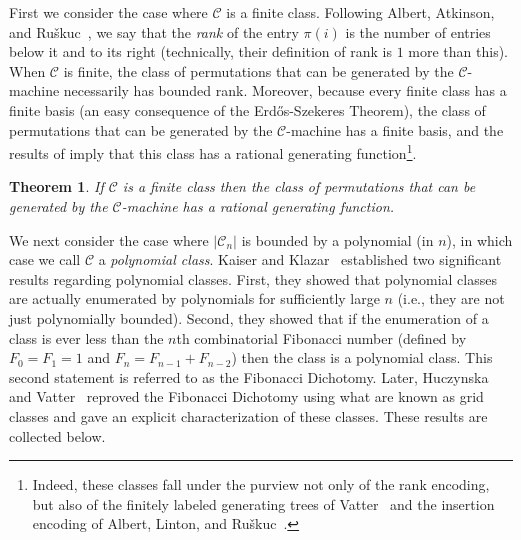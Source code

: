 \documentclass[10pt]{article}
\theoremstyle{plain}
\newtheorem{theorem}{Theorem}[section]
\theoremstyle{definition}
\newcommand{\C}{\mathcal{C}}
\begin{document}
First we consider the case where $\C$ is a finite class. Following Albert, Atkinson, and Ru\v{s}kuc~\cite{albert:regular-closed-:}, we say that the \emph{rank} of the entry $\pi(i)$ is the number of entries below it and to its right (technically, their definition of rank is $1$ more than this). When $\C$ is finite, the class of permutations that can be generated by the $\C$-machine necessarily has bounded rank. Moreover, because every finite class has a finite basis (an easy consequence of the Erd\H{o}s-Szekeres Theorem), the class of permutations that can be generated by the $\C$-machine has a finite basis, and the results of \cite{albert:regular-closed-:} imply that this class has a rational generating function\footnote{Indeed, these classes fall under the purview not only of the rank encoding, but also of the finitely labeled generating trees of Vatter~\cite{vatter:finitely-labele:} and the insertion encoding of Albert, Linton, and Ru\v{s}kuc~\cite{albert:the-insertion-e:}.}.

\begin{theorem}
\label{thm-finite-machine}
If $\C$ is a finite class then the class of permutations that can be generated by the $\C$-machine has a rational generating function.	
\end{theorem}


We next consider the case where $|\C_n|$ is bounded by a polynomial (in $n$), in which case we call $\C$ a \emph{polynomial class}. Kaiser and Klazar~\cite{kaiser:on-growth-rates:} established two significant results regarding polynomial classes. First, they showed that polynomial classes are actually enumerated by polynomials for sufficiently large $n$ (i.e., they are not just polynomially bounded). Second, they showed that if the enumeration of a class is ever less than the $n$th combinatorial Fibonacci number (defined by $F_0=F_1=1$ and $F_n=F_{n-1}+F_{n-2}$) then the class is a polynomial class. This second statement is referred to as the Fibonacci Dichotomy. Later, Huczynska and Vatter~\cite{huczynska:grid-classes-an:} reproved the Fibonacci Dichotomy using what are known as grid classes and gave an explicit characterization of these classes. These results are collected below.
\end{document}
